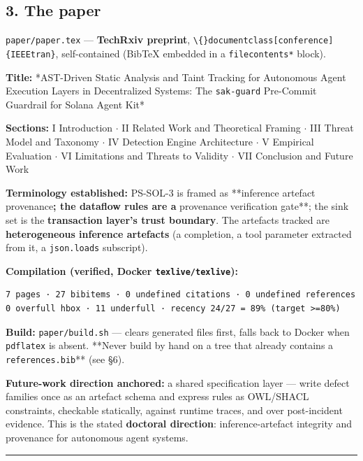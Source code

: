 \documentclass[10pt,a4paper]{article}
\begin{document}
\subsection*{3. The paper}

\texttt{paper/paper.tex} --- \textbf{TechRxiv preprint}, \texttt{\textbackslash\{\}documentclass[conference]\{IEEEtran\}},
self-contained (BibTeX embedded in a \texttt{filecontents*} block).

\textbf{Title:} *AST-Driven Static Analysis and Taint Tracking for Autonomous Agent
Execution Layers in Decentralized Systems: The \texttt{sak-guard} Pre-Commit Guardrail
for Solana Agent Kit*

\textbf{Sections:} I Introduction $\cdot$ II Related Work and Theoretical Framing $\cdot$
III Threat Model and Taxonomy $\cdot$ IV Detection Engine Architecture $\cdot$
V Empirical Evaluation $\cdot$ VI Limitations and Threats to Validity $\cdot$
VII Conclusion and Future Work

\textbf{Terminology established:} PS-SOL-3 is framed as **inference artefact
provenance\textbf{; the dataflow rules are a }provenance verification gate**; the sink
set is the \textbf{transaction layer's trust boundary}. The artefacts tracked are
\textbf{heterogeneous inference artefacts} (a completion, a tool parameter extracted
from it, a \texttt{json.loads} subscript).

\textbf{Compilation (verified, Docker \texttt{texlive/texlive}):}
\begin{verbatim}
7 pages · 27 bibitems · 0 undefined citations · 0 undefined references
0 overfull hbox · 11 underfull · recency 24/27 = 89% (target >=80%)
\end{verbatim}

\textbf{Build:} \texttt{paper/build.sh} --- clears generated files first, falls back to Docker
when \texttt{pdflatex} is absent. **Never build by hand on a tree that already contains
a \texttt{references.bib}** (see §6).

\textbf{Future-work direction anchored:} a shared specification layer --- write defect
families once as an artefact schema and express rules as OWL/SHACL constraints,
checkable statically, against runtime traces, and over post-incident evidence.
This is the stated \textbf{doctoral direction}: inference-artefact integrity and
provenance for autonomous agent systems.

\vspace{3pt}\hrule\vspace{5pt}
\end{document}

